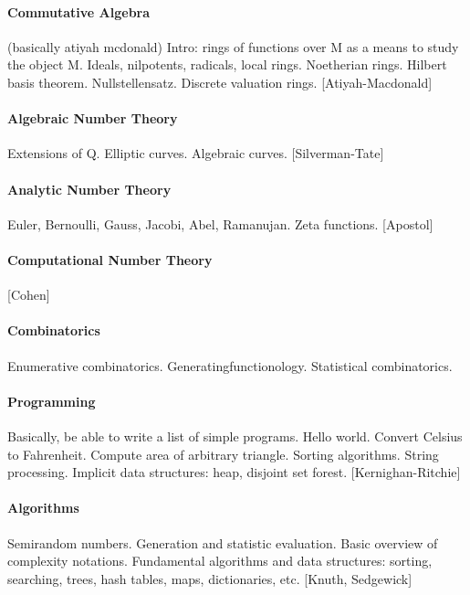 \paragraph{Commutative Algebra}
(basically atiyah mcdonald)
Intro: rings of functions over M as a means to study the object M.
Ideals, nilpotents, radicals, local rings.
Noetherian rings.  Hilbert basis theorem.
Nullstellensatz.
Discrete valuation rings.
[Atiyah-Macdonald]

\paragraph{Algebraic Number Theory}
Extensions of Q.
Elliptic curves.
Algebraic curves.
[Silverman-Tate]


\paragraph{Analytic Number Theory}
Euler, Bernoulli, Gauss, Jacobi, Abel, Ramanujan.
Zeta functions.
[Apostol]

\paragraph{Computational Number Theory}
[Cohen]

\paragraph{Combinatorics}
Enumerative combinatorics.
Generatingfunctionology.
Statistical combinatorics.


\paragraph{Programming}
Basically, be able to write a list of simple programs.
Hello world.  Convert Celsius to Fahrenheit.
Compute area of arbitrary triangle.
Sorting algorithms.  String processing.
Implicit data structures: heap, disjoint set forest.
[Kernighan-Ritchie]

\paragraph{Algorithms}
Semirandom numbers.  Generation and statistic evaluation.
Basic overview of complexity notations.
Fundamental algorithms and data structures: sorting, searching, trees, hash
tables, maps, dictionaries, etc.
[Knuth, Sedgewick]

